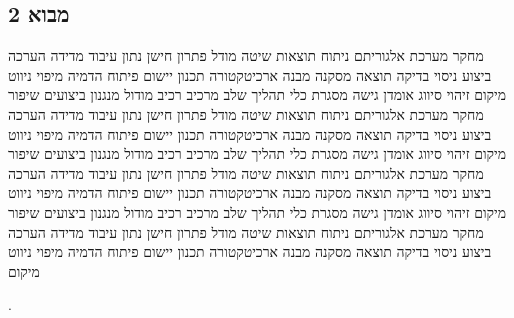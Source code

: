 \subsection{מבוא 2}
\label{sub:ch01_2}
מחקר מערכת אלגוריתם ניתוח תוצאות שיטה מודל פתרון חישן נתון עיבוד מדידה הערכה ביצוע ניסוי בדיקה תוצאה מסקנה מבנה ארכיטקטורה תכנון יישום פיתוח הדמיה מיפוי ניווט מיקום זיהוי סיווג אומדן גישה מסגרת כלי תהליך שלב מרכיב רכיב מודול מנגנון ביצועים שיפור מחקר מערכת אלגוריתם ניתוח תוצאות שיטה מודל פתרון חישן נתון עיבוד מדידה הערכה ביצוע ניסוי בדיקה תוצאה מסקנה מבנה ארכיטקטורה תכנון יישום פיתוח הדמיה מיפוי ניווט מיקום זיהוי סיווג אומדן גישה מסגרת כלי תהליך שלב מרכיב רכיב מודול מנגנון ביצועים שיפור מחקר מערכת אלגוריתם ניתוח תוצאות שיטה מודל פתרון חישן נתון עיבוד מדידה הערכה ביצוע ניסוי בדיקה תוצאה מסקנה מבנה ארכיטקטורה תכנון יישום פיתוח הדמיה מיפוי ניווט מיקום זיהוי סיווג אומדן גישה מסגרת כלי תהליך שלב מרכיב רכיב מודול מנגנון ביצועים שיפור מחקר מערכת אלגוריתם ניתוח תוצאות שיטה מודל פתרון חישן נתון עיבוד מדידה הערכה ביצוע ניסוי בדיקה תוצאה מסקנה מבנה ארכיטקטורה תכנון יישום פיתוח הדמיה מיפוי ניווט מיקום

 \cite{Thrun2005}\cite{Kalman1960}.